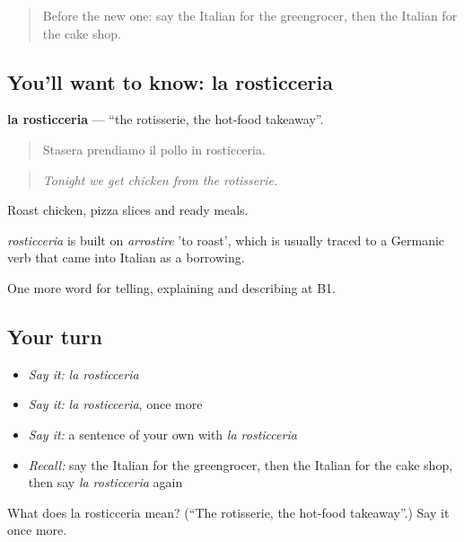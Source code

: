 \label{lesson:IT-C454-rosticceria}



\begin{quote}
Before the new one: say the Italian for the greengrocer, then the Italian for the cake shop.
\end{quote}

\subsection*{You'll want to know: la rosticceria}
\textbf{la rosticceria} — \textquotedblleft{}the rotisserie, the hot-food takeaway\textquotedblright{}.

\begin{quote}
Stasera prendiamo il pollo in rosticceria.
\end{quote}

\begin{quote}
\emph{Tonight we get chicken from the rotisserie.}
\end{quote}

Roast chicken, pizza slices and ready meals.

\begin{cousinweb}
\emph{rosticceria} is built on \emph{arrostire} 'to roast', which is usually traced to a Germanic verb that came into Italian as a borrowing.
\end{cousinweb}

\begin{grammarlens}[title={What you've built}]
One more word for telling, explaining and describing at B1.
\end{grammarlens}

\subsection*{Your turn}
\begin{itemize}
\raggedright
  \item \emph{Say it:} \emph{la rosticceria}
  \item \emph{Say it:} \emph{la rosticceria}, once more
  \item \emph{Say it:} a sentence of your own with \emph{la rosticceria}
  \item \emph{Recall:} say the Italian for the greengrocer, then the Italian for the cake shop, then say \emph{la rosticceria} again
\end{itemize}

\begin{tcolorbox}[breakable,colback=teal!4,colframe=teal!35!black,title={Before you move on}]
What does la rosticceria mean? (\textquotedblleft{}The rotisserie, the hot-food takeaway\textquotedblright{}.) Say it once more.
\end{tcolorbox}
